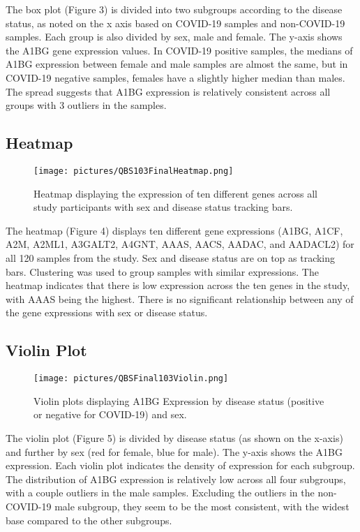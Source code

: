 \documentclass{article}
\begin{document}
The box plot (Figure 3) is divided into two subgroups according to the disease status, as noted on the x axis based on COVID-19 samples and non-COVID-19 samples. Each group is also divided by sex, male and female. The y-axis shows the A1BG gene expression values. In COVID-19 positive samples, the medians of A1BG expression between female and male samples are almost the same, but in COVID-19 negative samples, females have a slightly higher median than males. The spread suggests that A1BG expression is relatively consistent across all groups with 3 outliers in the samples. 



\subsection{Heatmap}
\begin{figure}[H]
    \centering
    \texttt{[image: pictures/QBS103FinalHeatmap.png]}
    \caption{Heatmap displaying the expression of ten different genes across all study participants with sex and disease status tracking bars.}
    \label{fig:placeholder}
\end{figure}

The heatmap (Figure 4) displays ten different gene expressions (A1BG, A1CF, A2M, A2ML1, A3GALT2, A4GNT, AAAS, AACS, AADAC, and AADACL2) for all 120 samples from the study. Sex and disease status are on top as tracking bars. Clustering was used to group samples with similar expressions. The heatmap indicates that there is low expression across the ten genes in the study, with AAAS being the highest. There is no significant relationship between any of the gene expressions with sex or disease status. 



\subsection{Violin Plot}
\begin{figure}[H]
    \centering
    \texttt{[image: pictures/QBSFinal103Violin.png]}
    \caption{Violin plots displaying A1BG Expression by disease status (positive or negative for COVID-19) and sex.}
    \label{fig:placeholder}
\end{figure}

The violin plot (Figure 5) is divided by disease status (as shown on the x-axis) and further by sex (red for female, blue for male). The y-axis shows the A1BG expression. Each violin plot indicates the density of expression for each subgroup. The distribution of A1BG expression is relatively low across all four subgroups, with a couple outliers in the male samples. Excluding the outliers in the non-COVID-19 male subgroup, they seem to be the most consistent, with the widest base compared to the other subgroups. 
\end{document}
